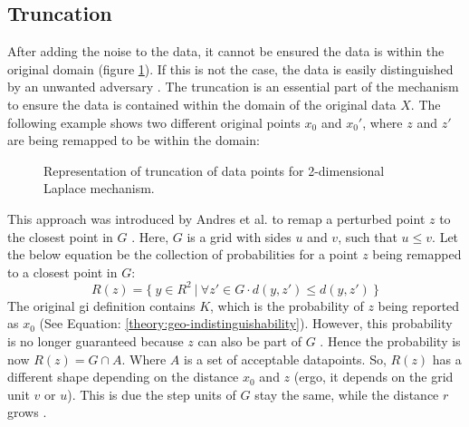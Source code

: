 \subsection{Truncation} \label{theory:truncation}
After adding the noise to the data, it cannot be ensured the data is within the original domain (figure \ref{figure:truncation-2d}).
If this is not the case, the data is easily distinguished by an unwanted adversary \citep{DBLP:journals/corr/abs-1212-1984,9646489}.
The truncation is an essential part of the mechanism to ensure the data is contained within the domain of the original data $X$. The following example shows two different original points $x_0$ and $x_0'$, where $z$ and $z'$ are being remapped to be within the domain:
\begin{figure}[H]
\centering
  
  \caption{Representation of truncation of data points for 2-dimensional Laplace mechanism.}
  \label{figure:truncation-2d}
\end{figure}
This approach was introduced by Andres et al. to remap a perturbed point $z$ to the closest point in $G$ \citep{DBLP:journals/corr/abs-1212-1984}.
Here, $G$ is a grid with sides $u$ and $v$, such that $u \leq v$.
Let the below equation be the collection of probabilities for a point $z$ being remapped to a closest point in $G$:
\begin{equation}
  R(z) = \{ \ y \in R^2 \ | \ \forall z' \in G \cdot d(y, z') \leq d(y, z') \ \}
  \label{eq:grid-probability}
\end{equation}
The original \gls{gi} definition contains $K$, which is the probability of $z$ being reported as $x_0$ (See Equation: \ref{theory:geo-indistinguishability}).
However, this probability is no longer guaranteed because $z$ can also be part of $G$ \citep{DBLP:journals/corr/abs-1212-1984}.
Hence the probability is now $R(z) = G \cap A$. Where $A$ is a set of acceptable datapoints.\newline
So, $R(z)$ has a different shape depending on the distance $x_0$ and $z$ (ergo, it depends on the grid unit $v$ or $u$). This is due the step units of $G$ stay the same, while the distance $r$ grows \citep{DBLP:journals/corr/abs-1212-1984}.

